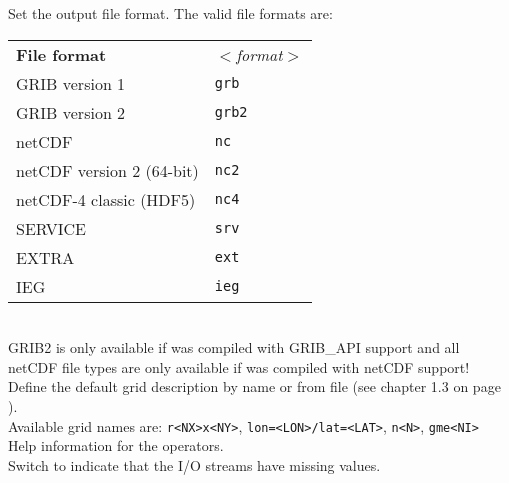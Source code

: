\begin{tabbing}
         \> Set the output file format. The valid file formats are: \\
         \> \parbox[r]{3in}{
              \vspace*{1mm}
              \hspace*{0cm}\begin{tabular}{|l|l|}
              \hline
              \rowcolor[gray]{.9}
              {\bf File format}          & \sl $<$format$>$ \\
               GRIB version 1            & {\tt grb}  \\
               GRIB version 2            & {\tt grb2} \\
               netCDF                    & {\tt nc}   \\
               netCDF version 2 (64-bit) & {\tt nc2}  \\
               netCDF-4 classic (HDF5)   & {\tt nc4}  \\
               SERVICE                   & {\tt srv}  \\
               EXTRA                     & {\tt ext}  \\
               IEG                       & {\tt ieg}  \\
              \hline
              \end{tabular}
              \vspace*{1mm}
            } \\
         \> GRIB2 is only available if {\CDO} was compiled with GRIB\_API support and all \\
         \> netCDF file types are only available if {\CDO} was compiled with netCDF support! \\
         \> Define the default grid description by name or from file (see chapter 1.3 on page \pageref{GRID_DESCRIPTION}). \\
         \> Available grid names are: {\tt r<NX>x<NY>}, {\tt lon=<LON>/lat=<LAT>}, {\tt n<N>}, {\tt gme<NI>} \\
         \> Help information for the operators. \\
         \> Switch to indicate that the I/O streams have missing values. \\

\end{tabbing}
